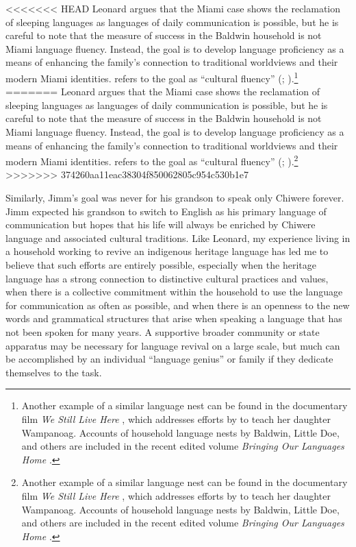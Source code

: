 \documentclass[output=paper]{LSP/langsci}
\begin{document}
<<<<<<< HEAD
Leonard argues that the Miami case shows the reclamation of sleeping languages as languages of daily communication is possible, but he is careful to note that the measure of success in the Baldwin household is not Miami language fluency. Instead, the goal is to develop language proficiency as a means of enhancing the family's connection to traditional worldviews and their modern Miami identities.  refers to the goal as ``cultural fluency'' (\citealt[36--37]{Leonard2007}; \citeyear[139--140]{Leonard2011}).\footnote{Another example of a similar language nest can be found in the documentary film \emph{We Still Live Here} \citep{Makepeace2011}, which addresses efforts by  to teach her daughter Wampanoag. Accounts of household language nests by Baldwin, Little Doe, and others are included in the recent edited volume \emph{Bringing Our Languages Home} \citep{Hinton2013}.} 
=======
Leonard argues that the Miami case shows the reclamation of sleeping languages as languages of daily communication is possible, but he is careful to note that the measure of success in the Baldwin household is not Miami language fluency. Instead, the goal is to develop language proficiency as a means of enhancing the family's connection to traditional worldviews and their modern Miami identities.  refers to the goal as ``cultural fluency'' (\citealt[36--37]{Leonard2007}; \citeyear[139--140]{Leonard2011}).\footnote{Another example of a similar language nest can be found in the documentary film \emph{We Still Live Here} \citep{Makepeace2011}, which addresses efforts by  to teach her daughter Wampanoag. Accounts of household language nests by Baldwin, Little Doe, and others are included in the recent edited volume \emph{Bringing Our Languages Home} \citep{Hinton 2013}.} 
>>>>>>> 374260aa11eac38304f850062805c954c530b1e7

Similarly, Jimm's goal was never for his grandson to speak only Chiwere forever. Jimm expected his grandson to switch to English as his primary language of communication but hopes that his life will always be enriched by Chiwere language and associated cultural traditions. Like Leonard, my experience living in a household working to revive an indigenous heritage language has led me to believe that such efforts are entirely possible, especially when the heritage language has a strong connection to distinctive cultural practices and values, when there is a collective commitment within the household to use the language for communication as often as possible, and when there is an openness to the new words and grammatical structures that arise when speaking a language that has not been spoken for many years. A supportive broader community or state apparatus may be necessary for language revival on a large scale, but much can be accomplished by an individual ``language genius'' or family if they dedicate themselves to the task.
\end{document}
